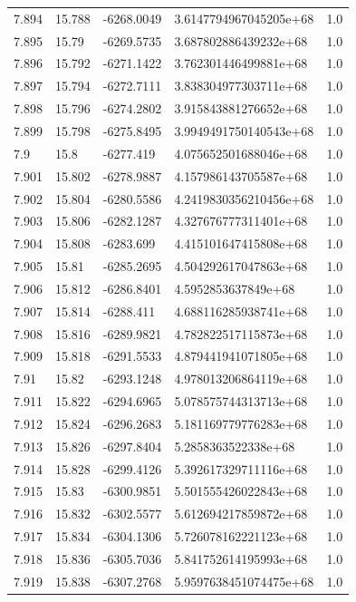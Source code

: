 \begin{tabular}{lllll}
7.894 & 15.788 & -6268.0049 & 3.6147794967045205e+68 & 1.0 \\
7.895 & 15.79 & -6269.5735 & 3.687802886439232e+68 & 1.0 \\
7.896 & 15.792 & -6271.1422 & 3.762301446499881e+68 & 1.0 \\
7.897 & 15.794 & -6272.7111 & 3.838304977303711e+68 & 1.0 \\
7.898 & 15.796 & -6274.2802 & 3.915843881276652e+68 & 1.0 \\
7.899 & 15.798 & -6275.8495 & 3.9949491750140543e+68 & 1.0 \\
7.9 & 15.8 & -6277.419 & 4.075652501688046e+68 & 1.0 \\
7.901 & 15.802 & -6278.9887 & 4.157986143705587e+68 & 1.0 \\
7.902 & 15.804 & -6280.5586 & 4.2419830356210456e+68 & 1.0 \\
7.903 & 15.806 & -6282.1287 & 4.327676777311401e+68 & 1.0 \\
7.904 & 15.808 & -6283.699 & 4.415101647415808e+68 & 1.0 \\
7.905 & 15.81 & -6285.2695 & 4.504292617047863e+68 & 1.0 \\
7.906 & 15.812 & -6286.8401 & 4.5952853637849e+68 & 1.0 \\
7.907 & 15.814 & -6288.411 & 4.688116285938741e+68 & 1.0 \\
7.908 & 15.816 & -6289.9821 & 4.782822517115873e+68 & 1.0 \\
7.909 & 15.818 & -6291.5533 & 4.879441941071805e+68 & 1.0 \\
7.91 & 15.82 & -6293.1248 & 4.978013206864119e+68 & 1.0 \\
7.911 & 15.822 & -6294.6965 & 5.078575744313713e+68 & 1.0 \\
7.912 & 15.824 & -6296.2683 & 5.181169779776283e+68 & 1.0 \\
7.913 & 15.826 & -6297.8404 & 5.2858363522338e+68 & 1.0 \\
7.914 & 15.828 & -6299.4126 & 5.392617329711116e+68 & 1.0 \\
7.915 & 15.83 & -6300.9851 & 5.501555426022843e+68 & 1.0 \\
7.916 & 15.832 & -6302.5577 & 5.612694217859872e+68 & 1.0 \\
7.917 & 15.834 & -6304.1306 & 5.726078162221123e+68 & 1.0 \\
7.918 & 15.836 & -6305.7036 & 5.841752614195993e+68 & 1.0 \\
7.919 & 15.838 & -6307.2768 & 5.9597638451074475e+68 & 1.0 \\

\end{tabular}
